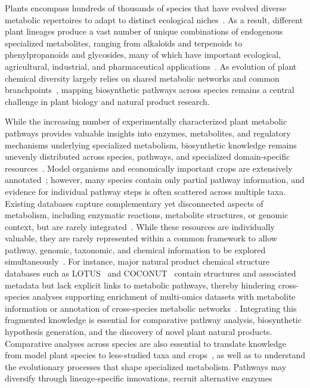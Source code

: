 \documentclass[11pt,a4paper]{article}
\begin{document}
Plants encompass hundreds of thousands of species that have evolved diverse metabolic repertoires to
adapt to distinct ecological niches~\cite{huang2023}. As a result, different plant lineages produce a
vast number of unique combinations of endogenous specialized metabolites, ranging from alkaloids and
terpenoids to phenylpropanoids and glycosides, many of which have important ecological, agricultural,
industrial, and pharmaceutical applications~\cite{domingo2023,owen2026,greco2026}. As evolution of
plant chemical diversity largely relies on shared metabolic networks and common
branchpoints~\cite{ji2024}, mapping biosynthetic pathways across species remains a central challenge
in plant biology and natural product research.

While the increasing number of experimentally characterized plant metabolic pathways provides
valuable insights into enzymes, metabolites, and regulatory mechanisms underlying specialized
metabolism, biosynthetic knowledge remains unevenly distributed across species, pathways, and
specialized domain-specific resources~\cite{moghe2018}. Model organisms and economically important crops are
extensively annotated~\cite{xue2023status}; however, many species contain only partial pathway information, and evidence
for individual pathway steps is often scattered across multiple taxa. Existing databases capture
complementary yet disconnected aspects of metabolism, including enzymatic reactions, metabolite
structures, or genomic context, but are rarely integrated~\cite{mcconnachie2025}. While these resources are individually
valuable, they are rarely represented within a common framework to allow pathway, genomic, taxonomic,
and chemical information to be explored simultaneously~\cite{mcconnachie2025}. For instance, major natural product chemical
structure databases such as LOTUS~\cite{rutz2022} and COCONUT~\cite{sorokina2021} contain structures
and associated metadata but lack explicit links to metabolic pathways, thereby hindering
cross-species analyses supporting enrichment of multi-omics datasets with metabolite information or
annotation of cross-species metabolic networks~\cite{mildau2025,singh2022}. Integrating this
fragmented knowledge is essential for comparative pathway analysis, biosynthetic hypothesis
generation, and the discovery of novel plant natural products. Comparative analyses across species
are also essential to translate knowledge from model plant species to less-studied taxa and
crops~\cite{uauy2025}, as well as to understand the evolutionary processes that shape specialized
metabolism. Pathways may diversify through lineage-specific innovations, recruit alternative enzymes
\end{document}
